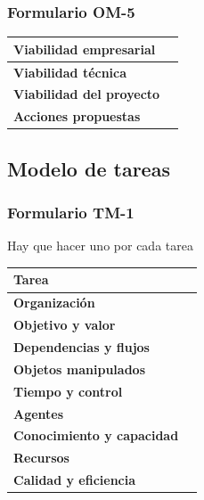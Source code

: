 \documentclass[a4paper,11pt]{article}
\begin{document}
			\subsubsection{Formulario OM-5}
			\begin{center}
				\begin{tabular}{| l | l |}
					\hline
					\textbf{Viabilidad empresarial} & \\
					\hline
					\textbf{Viabilidad técnica} & \\
					\hline
					\textbf{Viabilidad del proyecto} & \\
					\hline
					\textbf{Acciones propuestas} & \\
					\hline
				\end{tabular}
			\end{center}
		\subsection{Modelo de tareas}
			\subsubsection{Formulario TM-1}
			Hay que hacer uno por cada tarea
			\begin{center}
				\begin{tabular}{| l | l |}
					\hline
					\textbf{Tarea} & \\
					\hline
					\textbf{Organización} & \\
					\hline
					\textbf{Objetivo y valor} & \\
					\hline
					\textbf{Dependencias y flujos} & \\
					\hline
					\textbf{Objetos manipulados} & \\
					\hline
					\textbf{Tiempo y control} & \\
					\hline
					\textbf{Agentes} & \\
					\hline
					\textbf{Conocimiento y capacidad} & \\
					\hline
					\textbf{Recursos} & \\
					\hline
					\textbf{Calidad y eficiencia} & \\
					\hline
				\end{tabular}
			\end{center}
\end{document}
